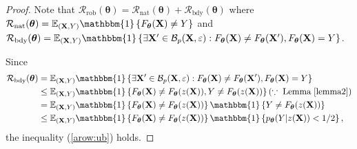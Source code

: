 \documentclass[nohyperref]{article}
\theoremstyle{plain}
\theoremstyle{definition}
\theoremstyle{remark}
\begin{document}
\multi*
\begin{proof}

Note that $\mathcal{R}_{\text{rob}}({\bm{\theta}}) = \mathcal{R}_{\text{nat}}({\bm{\theta}}) + \mathcal{R}_{\text{bdy}}({\bm{\theta}})$ where
$\mathcal{R}_{\text{nat}}(\bm{\theta}) = \mathbb{E}_{(\mathbf{X}, Y)}\mathbbm{1}\left\{ F_{\bm{\theta}}(\mathbf{X}) \neq Y \right\}$ and 
$\mathcal{R}_{\text{bdy}}(\bm{\theta}) = \mathbb{E}_{(\mathbf{X}, Y)}\mathbbm{1}\left\{\exists \mathbf{X}' \in \mathcal{B}_p(\mathbf{X}, \varepsilon) :F_{\bm{\theta}}(\mathbf{X})\neq F_{\bm{\theta}}(\mathbf{X}')   ,F_{\bm{\theta}}(\mathbf{X}) = Y   \right\}$.

Since
\begin{align*} 
\mathcal{R}_{\text{bdy}}({\bm{\theta}}) &= \mathbb{E}_{(\mathbf{X}, Y)}\mathbbm{1}\left\{\exists \mathbf{X}' \in \mathcal{B}_p(\mathbf{X}, \varepsilon) : F_{\bm{\theta}}(\mathbf{X}) \neq F_{\bm{\theta}}(\mathbf{X}'), F_{\bm{\theta}}(\mathbf{X})=Y \right\} \\ 
& \leq \mathbb{E}_{(\mathbf{X}, Y)}\mathbbm{1}\left\{F_{\bm{\theta}}(\mathbf{X}) \neq F_{\bm{\theta}}(z(\mathbf{X})), Y \neq F_{\bm{\theta}}(z(\mathbf{X}))\right\} (\because \text{\;Lemma\;} \ref{lemma2})\\
& = \mathbb{E}_{(\mathbf{X}, Y)} \mathbbm{1} \left\{ F_{\bm{\theta}}(\mathbf{X}) \neq F_{\bm{\theta}}(z(\mathbf{X})) \right\} \mathbbm{1}\left\{ Y \neq F_{\bm{\theta}}(z(\mathbf{X})) \right\} \\ 
& \leq  \mathbb{E}_{(\mathbf{X}, Y)} \mathbbm{1} \left\{ F_{\bm{\theta}}(\mathbf{X}) \neq F_{\bm{\theta}}(z(\mathbf{X})) \right\} \mathbbm{1} \left\{ p_{\bm{\theta}}(Y | z(\mathbf{X})) < 1/2 \right\},
\end{align*}
the inequality (\ref{arow:ub}) holds.
\end{proof}
\end{document}
